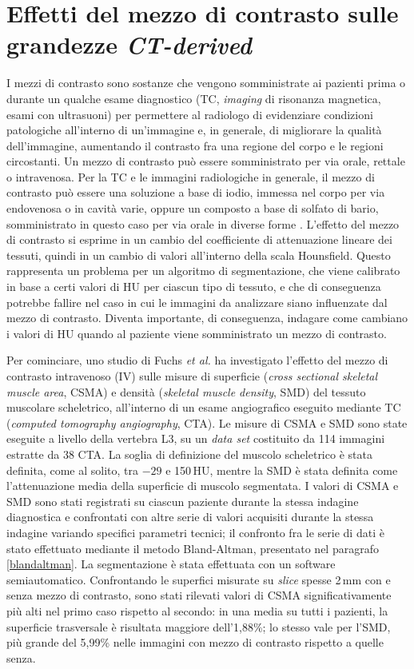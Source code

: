 \section{Effetti del mezzo di contrasto sulle grandezze \textit{CT-derived}}
I mezzi di contrasto sono sostanze che vengono somministrate ai pazienti prima o durante un qualche esame diagnostico (TC, \textit{imaging} di risonanza magnetica, esami con ultrasuoni) per permettere al radiologo di evidenziare condizioni patologiche all'interno di un’immagine e, in generale, di migliorare la qualità dell'immagine, aumentando il contrasto fra una regione del corpo e le regioni circostanti. Un mezzo di contrasto può essere somministrato per via orale, rettale o intravenosa. Per la TC e le immagini radiologiche in generale, il mezzo di contrasto può essere una soluzione a base di iodio, immessa nel corpo per via endovenosa o in cavità varie, oppure un composto a base di solfato di bario, somministrato in questo caso per via orale in diverse forme \cite{contrast}. L’effetto del mezzo di contrasto si esprime in un cambio del coefficiente di attenuazione lineare dei tessuti, quindi in un cambio di valori all'interno della scala Hounsfield. Questo rappresenta un problema per un algoritmo di segmentazione, che viene calibrato in base a certi valori di HU per ciascun tipo di tessuto, e che di conseguenza potrebbe fallire nel caso in cui le immagini da analizzare siano influenzate dal mezzo di contrasto. Diventa importante, di conseguenza, indagare come cambiano i valori di HU quando al paziente viene somministrato un mezzo di contrasto.

Per cominciare, uno studio di Fuchs \textit{et al.} \cite{Fuchs2018} ha investigato l’effetto del mezzo di contrasto intravenoso (IV) sulle misure di superficie (\textit{cross sectional skeletal muscle area}, CSMA) e densità (\textit{skeletal muscle density}, SMD) del tessuto muscolare scheletrico, all'interno di un esame angiografico eseguito mediante TC (\textit{computed tomography angiography}, CTA). Le misure di CSMA e SMD sono state eseguite a livello della vertebra L3, su un \textit{data set} costituito da 114 immagini estratte da 38 CTA. La soglia di definizione del muscolo scheletrico è stata definita, come al solito, tra $-29$ e 150\,HU, mentre la SMD è stata definita come l’attenuazione media della superficie di muscolo segmentata. I valori di CSMA e SMD sono stati registrati su ciascun paziente durante la stessa indagine diagnostica e confrontati con altre serie di valori acquisiti durante la stessa indagine variando specifici parametri tecnici; il confronto fra le serie di dati è stato effettuato mediante il metodo Bland-Altman, presentato nel paragrafo \ref{blandaltman}. La segmentazione è stata effettuata con un software semiautomatico. Confrontando le superfici misurate su \textit{slice} spesse 2\,mm con e senza mezzo di contrasto, sono stati rilevati valori di CSMA significativamente più alti nel primo caso rispetto al secondo: in una media su tutti i pazienti, la superficie trasversale è risultata maggiore dell'1,88\%; lo stesso vale per l’SMD, più grande del 5,99\% nelle immagini con mezzo di contrasto rispetto a quelle senza.

